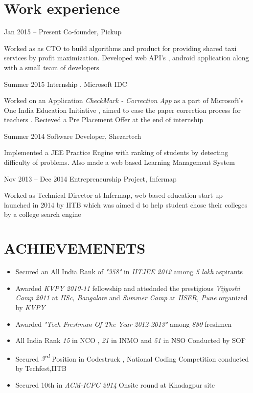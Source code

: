 \documentclass[fontsize=10pt]{tccv}
\begin{document}
\section{Work experience}

\begin{eventlist}

\item{Jan 2015 -- Present}
     {}
     {Co-founder, Pickup}

Worked as as CTO to build algorithms and product for providing shared taxi services by profit maximization. Developed web API’s , android application along with a small team of developers

\item{Summer 2015}
     {}
     {Internship , Microsoft IDC}

Worked on an Application \textit{CheckMark - Correction App} as a part of Microsoft\rq s One India Education Initiative , aimed to ease the paper correction process for teachers . Recieved a Pre Placement Offer at the end of internship

\item{Summer 2014}
     {}
     {Software Developer, Shezartech }

Implemented a JEE Practice Engine with ranking of students by detecting difficulty of problems. Also made a web based Learning Management System

\item{Nov 2013 -- Dec 2014}
     {}
     {Entrepreneurship Project, Infermap}

Worked as Technical Director at Infermap, web based education start-up launched in 2014 by IITB which was aimed d to help student chose their colleges by a college search engine

\end{eventlist}

\vspace{-9mm}
\section{ACHIEVEMENETS}
\begin{itemize}
\itemsep-0.3em
\item Secured an All India Rank of {\it "358"} in {\it IITJEE 2012} among {\it 5 lakh} aspirants
\item Awarded {\it KVPY 2010-11} fellowship and  attednded the prestigious {\it Vijyoshi Camp 2011} at {\it IISc, Bangalore} and {\it Summer 
Camp} at {\it IISER, Pune} organized by {\it KVPY}
\item Awarded {\it "Tech Freshman Of The Year 2012-2013"} among {\it 880} freshmen 
\item All India Rank {\it 15} in NCO , {\it 21} in INMO and {\it 51} in NSO Conducted by SOF
\item Secured {\it 3\textsuperscript{rd}} Position in Codestruck , National Coding Competition conducted by Techfest,IITB
\item Secured 10th in {\it ACM-ICPC 2014} Onsite round at Khadagpur site
\end{itemize}
\end{document}
